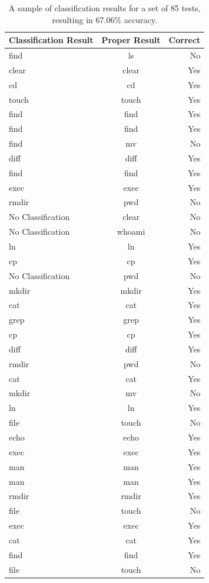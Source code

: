 \documentclass[12pt]{article}
\begin{document}
\begin{table}
  \centering
    \begin{tabular}{ | l | c | r | }
      \hline
      Classification Result & Proper Result & Correct \\ \hline
      find & ls	& No \\ \hline
      clear	& clear	& Yes \\ \hline
      cd & cd	& Yes \\ \hline
      touch	& touch	& Yes \\ \hline
      find & find	& Yes \\ \hline
      find & find & Yes \\ \hline
      find & mv & No \\ \hline
      diff & diff & Yes \\ \hline
      find & find & Yes \\ \hline
      exec & exec	& Yes \\ \hline
      rmdir	& pwd & No \\ \hline
      No Classification	& clear & No \\ \hline
      No Classification	& whoami & No \\ \hline
      ln & ln & Yes \\ \hline
      cp & cp & Yes \\ \hline
      No Classification & pwd & No \\ \hline
      mkdir & mkdir & Yes \\ \hline
      cat & cat & Yes \\ \hline
      grep & grep & Yes \\ \hline
      cp & cp & Yes \\ \hline
      diff & diff & Yes \\ \hline
      rmdir & pwd & No \\ \hline
      cat & cat & Yes \\ \hline
      mkdir & mv & No \\ \hline
      ln & ln & Yes \\ \hline
      file & touch & No \\ \hline
      echo & echo & Yes \\ \hline
      exec & exec & Yes \\ \hline
      man & man & Yes \\ \hline
      man & man & Yes \\ \hline
      rmdir & rmdir & Yes \\ \hline
      file & touch & No \\ \hline
      exec & exec & Yes \\ \hline
      cat & cat & Yes \\ \hline
      find & find & Yes \\ \hline
      file & touch & No \\ \hline
    \end{tabular}
    \caption{A sample of classification results for a set of 85 tests, resulting in 67.06\% accuracy. }
    \label{table_results}
\end{table}
\end{document}
